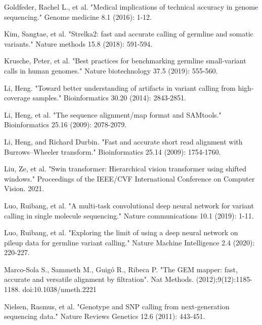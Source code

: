 \documentclass[]{article}
\begin{document}
\vspace{8pt}
Goldfeder, Rachel L., et al. "Medical implications of technical accuracy in genome sequencing." Genome medicine 8.1 (2016): 1-12.

\vspace{8pt}
Kim, Sangtae, et al. "Strelka2: fast and accurate calling of germline and somatic variants." Nature methods 15.8 (2018): 591-594.

\vspace{8pt}
Krusche, Peter, et al. "Best practices for benchmarking germline small-variant calls in human genomes." Nature biotechnology 37.5 (2019): 555-560.

\vspace{8pt}
Li, Heng. "Toward better understanding of artifacts in variant calling from high-coverage samples." Bioinformatics 30.20 (2014): 2843-2851.

\vspace{8pt}
Li, Heng, et al. "The sequence alignment/map format and SAMtools." Bioinformatics 25.16 (2009): 
2078-2079.


\vspace{8pt}
Li, Heng, and Richard Durbin. "Fast and accurate short read alignment with Burrows–Wheeler transform." Bioinformatics 25.14 (2009): 1754-1760.

\vspace{8pt}
Liu, Ze, et al. "Swin transformer: Hierarchical vision transformer using shifted windows." Proceedings of the IEEE/CVF International Conference on Computer Vision. 2021.

\vspace{8pt}
Luo, Ruibang, et al. "A multi-task convolutional deep neural network for variant calling in single molecule sequencing." Nature communications 10.1 (2019): 1-11.

\vspace{8pt}
Luo, Ruibang, et al. "Exploring the limit of using a deep neural network on pileup data for germline variant calling." Nature Machine Intelligence 2.4 (2020): 220-227.

\vspace{8pt}
Marco-Sola S., Sammeth M., Guigó R., Ribeca P. "The GEM mapper: fast, accurate and versatile alignment by filtration". Nat Methods. (2012);9(12):1185-1188. doi:10.1038/nmeth.2221

\vspace{8pt}
Nielsen, Rasmus, et al. "Genotype and SNP calling from next-generation sequencing data." Nature Reviews Genetics 12.6 (2011): 443-451.
\end{document}
